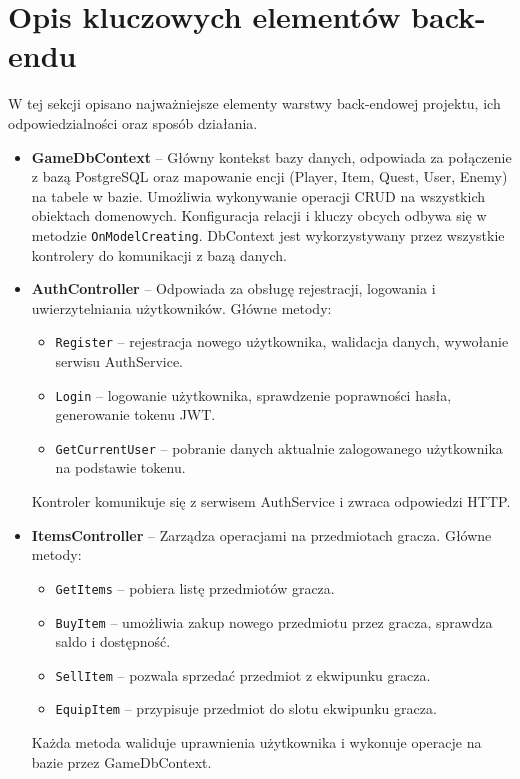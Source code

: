 ﻿%

\chapter{Opis kluczowych elementów back-endu}

W tej sekcji opisano najważniejsze elementy warstwy back-endowej projektu, ich odpowiedzialności oraz sposób działania.

\begin{itemize}
    \item \textbf{GameDbContext} -- Główny kontekst bazy danych, odpowiada za połączenie z bazą PostgreSQL oraz mapowanie encji (Player, Item, Quest, User, Enemy) na tabele w bazie. Umożliwia wykonywanie operacji CRUD na wszystkich obiektach domenowych. Konfiguracja relacji i kluczy obcych odbywa się w metodzie \texttt{OnModelCreating}. DbContext jest wykorzystywany przez wszystkie kontrolery do komunikacji z bazą danych.

    \item \textbf{AuthController} -- Odpowiada za obsługę rejestracji, logowania i uwierzytelniania użytkowników. Główne metody:
    \begin{itemize}
        \item \texttt{Register} -- rejestracja nowego użytkownika, walidacja danych, wywołanie serwisu AuthService.
        \item \texttt{Login} -- logowanie użytkownika, sprawdzenie poprawności hasła, generowanie tokenu JWT.
        \item \texttt{GetCurrentUser} -- pobranie danych aktualnie zalogowanego użytkownika na podstawie tokenu.
    \end{itemize}
    Kontroler komunikuje się z serwisem AuthService i zwraca odpowiedzi HTTP.

    \item \textbf{ItemsController} -- Zarządza operacjami na przedmiotach gracza. Główne metody:
    \begin{itemize}
        \item \texttt{GetItems} -- pobiera listę przedmiotów gracza.
        \item \texttt{BuyItem} -- umożliwia zakup nowego przedmiotu przez gracza, sprawdza saldo i dostępność.
        \item \texttt{SellItem} -- pozwala sprzedać przedmiot z ekwipunku gracza.
        \item \texttt{EquipItem} -- przypisuje przedmiot do slotu ekwipunku gracza.
    \end{itemize}
    Każda metoda waliduje uprawnienia użytkownika i wykonuje operacje na bazie przez GameDbContext.


\end{itemize}
